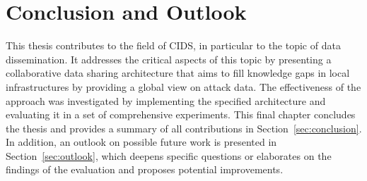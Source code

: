 \documentclass[../../main.tex]{subfiles}
\begin{document}
\chapter{Conclusion and Outlook}\label{ch:conclusion}

This thesis contributes to the field of CIDS, in particular to the topic of data dissemination. It addresses the critical aspects of this topic by presenting a collaborative data sharing architecture that aims to fill knowledge gaps in local infrastructures by providing a global view on attack data. The effectiveness of the approach was investigated by implementing the specified architecture and evaluating it in a set of comprehensive experiments. This final chapter concludes the thesis and provides a summary of all contributions in Section~\ref{sec:conclusion}. In addition, an outlook on possible future work is presented in Section~\ref{sec:outlook}, which deepens specific questions or elaborates on the findings of the evaluation and proposes potential improvements.
\newpage
\end{document}
